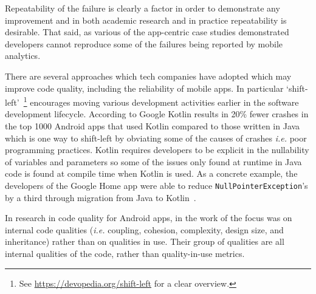 Repeatability of the failure is clearly a factor in order to demonstrate any improvement and in both academic research and in practice repeatability is desirable. That said, as various of the app-centric case studies demonstrated developers cannot reproduce some of the failures being reported by mobile analytics. 

There are several approaches which tech companies have adopted which may improve code quality, including the reliability of mobile apps. In particular `shift-left'~\footnote{See \url{https://devopedia.org/shift-left} for a clear overview.} encourages moving various development activities earlier in the software development lifecycle. According to Google Kotlin results in 20\% fewer crashes in the top 1000 Android apps that used Kotlin compared to those written in Java~\citep{googleblogs2021_androids_kotlin_first_approach, muntenescu2020_fewer_crashes_and_more_stability_with_kotlin} which is one way to shift-left by obviating some of the causes of crashes \emph{i.e.} poor programming practices. Kotlin requires developers to be explicit in the nullability of variables and parameters so some of the issues only found at runtime in Java code is found at compile time when Kotlin is used. As a concrete example, the developers of the Google Home app were able to reduce \texttt{NullPointerException}'s by a third through migration from Java to Kotlin~\citep{googleblogs2020_google_home_reduces_crashes_by_a_third}.

In research in code quality for Android apps, in the work of \citet{Hamdi2021empirical} the focus was on internal code qualities (\emph{i.e.} coupling, cohesion, complexity, design size, and inheritance) rather than on qualities in use. Their group of qualities are all internal qualities of the code, rather than quality-in-use metrics. 

